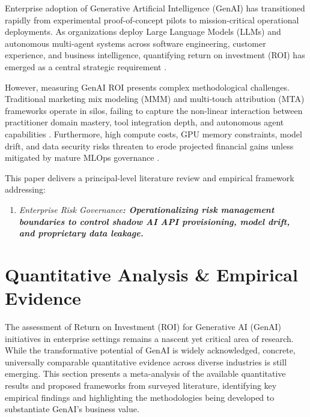 \documentclass[10pt,twocolumn,letterpaper]{article}
\begin{document}
Enterprise adoption of Generative Artificial Intelligence (GenAI) has transitioned rapidly from experimental proof-of-concept pilots to mission-critical operational deployments. As organizations deploy Large Language Models (LLMs) and autonomous multi-agent systems across software engineering, customer experience, and business intelligence, quantifying return on investment (ROI) has emerged as a central strategic requirement \cite{crossref_10_2139_ssrn_6374778}. 

However, measuring GenAI ROI presents complex methodological challenges. Traditional marketing mix modeling (MMM) and multi-touch attribution (MTA) frameworks operate in silos, failing to capture the non-linear interaction between practitioner domain mastery, tool integration depth, and autonomous agent capabilities \cite{openalex_w4400993506,crossref_10_2139_ssrn_6065919,crossref_10_47363_jaicc_icadccs2026_2026_5_20}. Furthermore, high compute costs, GPU memory constraints, model drift, and data security risks threaten to erode projected financial gains unless mitigated by mature MLOps governance \cite{crossref_10_2139_ssrn_6374778,crossref_10_2139_ssrn_6869661,openalex_w4410320336,crossref_10_21203_rs_3_rs_9890887_v1}.

This paper delivers a principal-level literature review and empirical framework addressing:
\begin{enumerate}
  \item \textit{Enterprise Risk Governance\textbf{: Operationalizing risk management boundaries to control shadow AI API provisioning, model drift, and proprietary data leakage.}}
\end{enumerate}


\section{Quantitative Analysis \& Empirical Evidence}


The assessment of Return on Investment (ROI) for Generative AI (GenAI) initiatives in enterprise settings remains a nascent yet critical area of research. While the transformative potential of GenAI is widely acknowledged, concrete, universally comparable quantitative evidence across diverse industries is still emerging. This section presents a meta-analysis of the available quantitative results and proposed frameworks from surveyed literature, identifying key empirical findings and highlighting the methodologies being developed to substantiate GenAI's business value.
\end{document}
